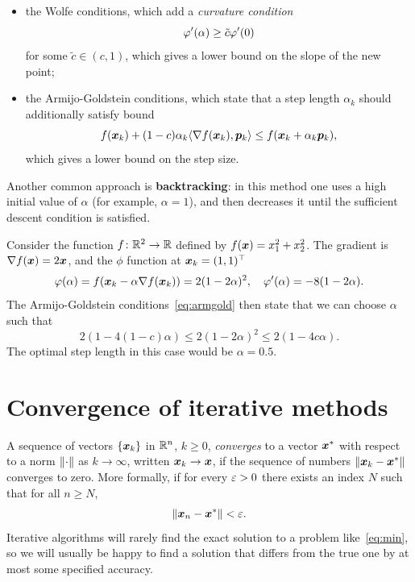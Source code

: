 \begin{itemize}
\item the Wolfe conditions, which add a {\em curvature condition}
\begin{equation*}
\varphi'(\alpha)\geq \tilde{c} \varphi'(0)
\end{equation*}
for some $\tilde{c}\in (c,1)$, which gives a lower bound on the slope of the new point;
\item the Armijo-Goldstein conditions, which state that a step length $\alpha_k$ should additionally satisfy bound 
\begin{equation}\label{eq:armgold}
  f(\bm{x}_k)+(1-c)\alpha_k \langle {\nabla f(\bm{x}_k)}, {\bm{p}_k} \rangle \leq f(\bm{x}_k+\alpha_k \bm{p}_k),
\end{equation}
which gives a lower bound on the step size.
\end{itemize}

Another common approach is \textbf{backtracking}: in this method one uses a high initial value of $\alpha$ (for example, $\alpha=1$), and then decreases it until the sufficient descent condition is satisfied. 

\begin{example}
 Consider the function $f\colon \mathbb{R}^2\to \mathbb{R}$ defined by $f(\bm{x}) = x_1^2+x_2^2$. The gradient is $\nabla f(\bm{x}) = 2\bm{x}$, and the $\phi$ function at $\bm{x}_k=(1,1)^{\top}$
 \begin{equation*}
  \varphi(\alpha) = f(\bm{x}_k-\alpha \nabla f(\bm{x}_k)) = 2(1-2\alpha)^2, \quad \varphi'(\alpha) = -8(1-2\alpha).
 \end{equation*}
The Armijo-Goldstein conditions~\eqref{eq:armgold} then state that we can choose $\alpha$ such that
\begin{equation*}
 2(1-4(1-c)\alpha) \leq 2(1-2\alpha)^2 \leq 2(1-4c\alpha).
\end{equation*}
The optimal step length in this case would be $\alpha=0.5$.
\end{example}

\section{Convergence of iterative methods}
A sequence of vectors $\{\bm{x}_k\}$ in $\mathbb{R}^n$, $k\geq 0$, {\em converges} to a vector $\bm{x}^*$ with respect to a norm $\Vert {\cdot}\Vert$ as $k\to \infty$, written $\bm{x}_k\to \bm{x}$, if the sequence of numbers $\Vert {\bm{x}_k-\bm{x}^*}\Vert$ converges to zero. More formally, if for every $\varepsilon>0$ there exists an index $N$ such that for all $n\geq N$,
\begin{equation*}
 \Vert {\bm{x}_n-\bm{x}^*}\Vert< \varepsilon.
\end{equation*}
Iterative algorithms will rarely find the exact solution to a problem like~\eqref{eq:min}, so we will usually be happy to find a solution that differs from the true one by at most some specified accuracy.

